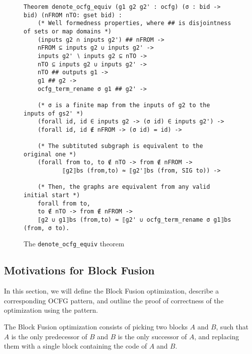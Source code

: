 \documentclass[11pt]{article}
\newcommand{\inlinecoq}[1]{\mbox{\lstinline[style=customcoq,columns=fixed,basewidth=.48em]{#1}}}
\newcommand{\ilc}[1]{\inlinecoq{#1}}
\begin{document}


\begin{figure}
\begin{lstlisting}[style=customcoq,basicstyle=\small\ttfamily]
Theorem denote_ocfg_equiv (g1 g2 g2' : ocfg) (σ : bid -> bid) (nFROM nTO: gset bid) :
    (* Well formedness properties, where ## is disjointness of sets or map domains *)
    (inputs g2 ∩ inputs g2') ## nFROM -> 
    nFROM ⊆ inputs g2 ∪ inputs g2' ->
    inputs g2' ∖ inputs g2 ⊆ nTO -> 
    nTO ⊆ inputs g2 ∪ inputs g2' -> 
    nTO ## outputs g1 ->
    g1 ## g2 -> 
    ocfg_term_rename σ g1 ## g2' ->

    (* σ is a finite map from the inputs of g2 to the inputs of gs2' *)
    (forall id, id ∈ inputs g2 -> (σ id) ∈ inputs g2') ->
    (forall id, id ∉ nFROM -> (σ id) = id) ->

    (* The subtituted subgraph is equivalent to the original one *)
    (forall from to, to ∉ nTO -> from ∉ nFROM -> 
           ⟦g2⟧bs (from,to) ≈ ⟦g2'⟧bs (from, SIG to)) ->

    (* Then, the graphs are equivalent from any valid initial start *)
    forall from to,
    to ∉ nTO -> from ∉ nFROM ->
    ⟦g2 ∪ g1⟧bs (from,to) ≈ ⟦g2' ∪ ocfg_term_rename σ g1⟧bs (from, σ to).
  \end{lstlisting}
  \caption{The \ilc{denote_ocfg_equiv} theorem}
  \label{fig:ocfg_equiv}
\end{figure}

\subsection{Motivations for Block Fusion}

In this section, we will define the Block Fusion optimization, describe a corresponding OCFG pattern,
and outline the proof of correctness of the optimization using the pattern.

The Block Fusion optimization consists of picking two blocks $A$ and $B$,
such that $A$ is the only predecessor of $B$ and $B$ is the only successor of $A$,
and replacing them with a single block containing the code of $A$ and $B$.
\end{document}
